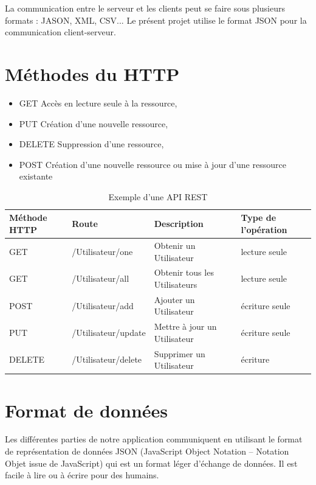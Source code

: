 La communication entre le serveur et les clients peut se faire sous plusieurs formats : JASON, XML, CSV... Le présent projet utilise le format JSON pour la communication client-serveur.

\section{Méthodes du HTTP}

\begin{itemize}
	\item GET Accès en lecture seule à la ressource,
	\item PUT Création d’une nouvelle ressource,
	\item DELETE Suppression d’une ressource,
	\item POST Création d’une nouvelle ressource ou mise à jour d’une ressource existante
\end{itemize}

\begin{table}[!h]
	\caption{Exemple d’une API REST}
	\begin{tabular}{|L{3cm}|L{3cm}|L{4cm}|L{3cm}|}
		\hline
		Méthode HTTP & Route & Description & Type de l'opération\\
		\hline
		\hline
		GET & /Utilisateur/one & Obtenir un Utilisateur & lecture seule\\
		\hline
		GET & /Utilisateur/all & Obtenir tous les Utilisateurs & lecture seule\\
		\hline
		POST & /Utilisateur/add & Ajouter un Utilisateur & écriture seule\\
		\hline
		PUT & /Utilisateur/update & Mettre à jour un Utilisateur & écriture seule\\
		\hline
		DELETE & /Utilisateur/delete & Supprimer un Utilisateur & écriture\\
		\hline  
	\end{tabular}
	
\end{table}

\pagebreak

\section{Format de données}

Les différentes parties de notre application communiquent en utilisant le format de représentation de données JSON (JavaScript Object Notation – Notation Objet issue de JavaScript) qui est un format léger d'échange de données. Il est facile à lire ou à écrire pour des humains. 

